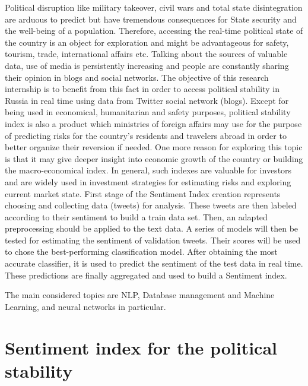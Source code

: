 \documentclass[12pt,a4paper]{article}
\begin{document}
Political disruption like military takeover, civil wars and total state disintegration are arduous to predict but have tremendous consequences for State security and the well-being of a population. Therefore, accessing the real-time political state of the country is an object for exploration and might be advantageous for safety, tourism, trade, international affairs etc. Talking about the sources of valuable data, use of media is persistently increasing and people are constantly sharing their opinion in blogs and social networks. The objective of this research internship is to benefit from this fact in order to access political stability in Russia in real time using data from Twitter social network (blogs). Except for being used in economical, humanitarian and safety purposes, political stability index is also a product which ministries of foreign affairs may use for the purpose of predicting risks for the country's residents and travelers abroad in order to better organize their reversion if needed. One more reason for exploring this topic is that it may give deeper insight into economic growth of the country or building the macro-economical index. In general, such indexes are valuable for investors and are widely used in investment strategies for estimating risks and exploring current market state.
First stage of the Sentiment Index creation represents choosing and collecting data (tweets) for analysis. These tweets are then labeled according to their sentiment to build a train data set. Then, an adapted preprocessing should be applied to the text data. A series of models will then be tested for estimating the sentiment of validation tweets. Their scores will be used to chose the best-performing classification model. After obtaining the most accurate classifier, it is used to predict the sentiment of the test data in real time. These predictions are finally aggregated and used to build a Sentiment index.

The main considered topics are NLP, Database management and Machine Learning, and neural networks in particular.
\newpage

\section{Sentiment index for the political stability}
\end{document}
